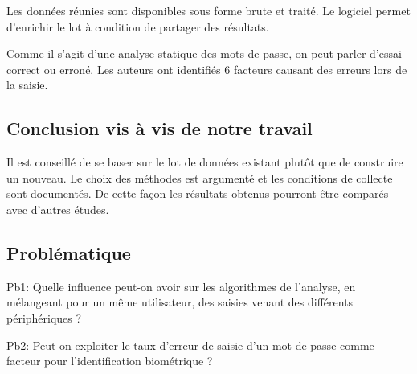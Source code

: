 Les données réunies sont disponibles sous forme brute et traité. Le logiciel permet d'enrichir le lot à condition de partager des résultats.

Comme il s'agit d'une analyse statique des mots de passe, on peut parler d'essai correct ou erroné. Les auteurs ont identifiés 6 facteurs causant des erreurs lors de la saisie.

\subsection{Conclusion vis à vis de notre travail}
Il est conseillé de se baser sur le lot de données existant plutôt que de construire un nouveau. Le choix des méthodes est argumenté et les conditions de collecte sont documentés. De cette façon les résultats obtenus pourront être comparés avec d'autres études.

\subsection{Problématique}
Pb1: Quelle influence peut-on avoir sur les algorithmes de l'analyse, en mélangeant pour un même utilisateur, des saisies venant des différents périphériques ?

Pb2: Peut-on exploiter le taux d'erreur de saisie d'un mot de passe comme facteur pour l'identification biométrique ?
